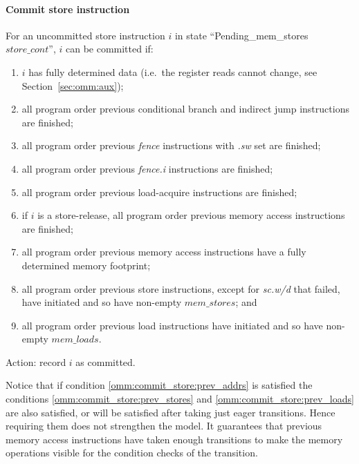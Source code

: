 \paragraph{Commit store instruction}\label{omm:thread:commit_store}
For an uncommitted store instruction $i$ in state ``{\sc Pending\_mem\_stores} $store\_cont$'', $i$ can be committed if:
\begin{enumerate}
\item $i$ has fully determined data (i.e.~the register reads cannot change, see Section~\ref{sec:omm:aux});
\item all program order previous conditional branch and indirect jump instructions are finished;
\item all program order previous {\em fence} instructions with {\em .sw} set are finished;
\item all program order previous {\em fence.i} instructions are finished; 
\item all program order previous load-acquire instructions are finished;
\item  if $i$ is a store-release, all program order previous memory access instructions are finished;
\item\label{omm:commit_store:prev_addrs} all program order previous memory access instructions have a fully determined memory footprint;
\item\label{omm:commit_store:prev_stores} all program order previous store instructions, except for {\em sc.w/d} that failed, have initiated and so have non-empty $mem\_stores$; and
\item\label{omm:commit_store:prev_loads} all program order previous load instructions have initiated and so have non-empty $mem\_loads$.
\end{enumerate}
Action: record $i$ as committed.

\begin{commentary}
Notice that if condition \ref{omm:commit_store:prev_addrs} is satisfied the conditions \ref{omm:commit_store:prev_stores} and \ref{omm:commit_store:prev_loads} are also satisfied, or will be satisfied after taking just eager transitions.
Hence requiring them does not strengthen the model.
It guarantees that previous memory access instructions have taken enough transitions to make the memory operations visible for the condition checks of the  transition.
\end{commentary}


